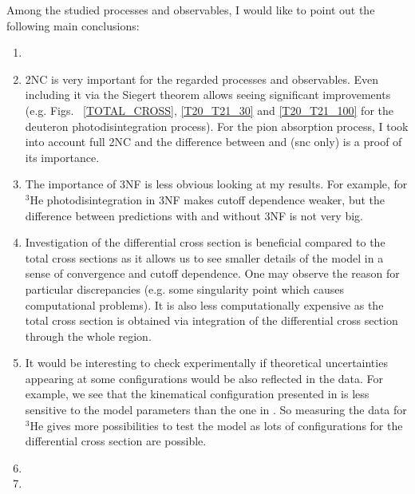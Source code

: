Among the studied processes and observables, I would like to point out the following 
main conclusions:

\begin{enumerate}
    \item {}
    \item 2NC is very important for the regarded processes and observables. Even including it via the Siegert theorem allows seeing significant improvements (e.g. Figs.~ \ref{TOTAL_CROSS}, \ref{T20_T21_30} and \ref{T20_T21_100} for the deuteron photodisintegration process). For the pion absorption process, I took into account full 2NC and the difference between  and  (\gls{snc} only) is a proof of its importance.
    \item The importance of 3NF is less obvious looking at my results. For example, for $^3$He photodisintegration in  3NF makes cutoff dependence weaker, but the difference between predictions with and without 3NF is not very big.
    \item Investigation of the differential cross section is beneficial compared to the total cross sections as it allows us to see smaller details of the model in a sense of convergence and cutoff dependence. One may observe the reason for particular discrepancies (e.g. some singularity point which causes computational problems). It is also less computationally expensive as the total cross section is obtained via integration of the differential cross section through the whole region.
    \item It would be interesting to check experimentally if theoretical uncertainties appearing at some configurations would be also reflected in the data. For example, we see that the kinematical configuration presented in  is less sensitive to the model parameters than the one in . So measuring the data for $^3$He gives more possibilities to test the model as lots of configurations for the differential cross section are possible.
    \item {}
    \item {}
\end{enumerate}


